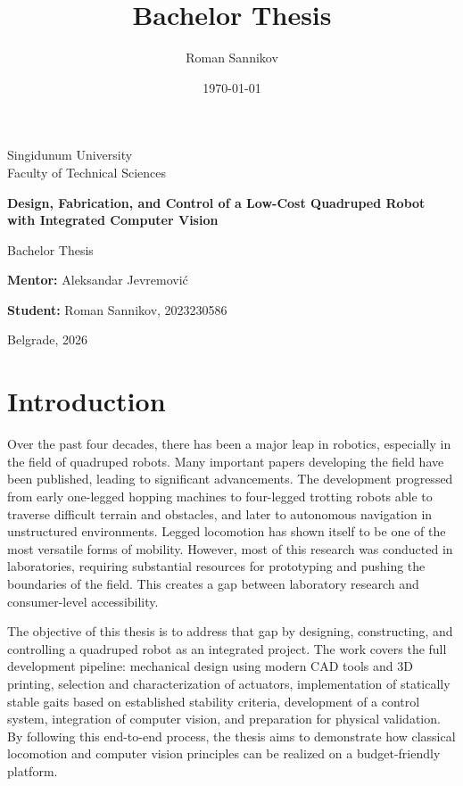 \documentclass[a4paper,12pt]{report}
\title{Bachelor Thesis}
\author{Roman Sannikov}
\date{\today}
\begin{document}
\begin{titlepage}
  \centering
  \vspace*{1cm}
  {\Large Singidunum University\\Faculty of Technical Sciences\par}
  \vfill
  {\LARGE\bfseries Design, Fabrication, and Control of a Low-Cost Quadruped Robot with Integrated
Computer Vision\par}
  \vspace{1cm}
  {\large Bachelor Thesis\par}
  \vfill
  \noindent
  \begin{minipage}[t]{0.48\textwidth}
    \textbf{Mentor:} Aleksandar Jevremović\par
  \end{minipage}
  \hfill
  \begin{minipage}[t]{0.48\textwidth}
    \raggedleft\textbf{Student:} Roman Sannikov, 2023230586\par
  \end{minipage}
  \vfill
  Belgrade, 2026\par
\end{titlepage}
\tableofcontents
\cleardoublepage


\chapter{Introduction}
Over the past four decades, there has been a major leap in robotics, especially in the field of
quadruped robots. Many important papers developing the field have been published, leading to
significant advancements. The development progressed from early one-legged hopping machines to
four-legged trotting robots able to traverse difficult terrain and obstacles, and later to
autonomous navigation in unstructured environments. Legged locomotion has shown itself to be one
of the most versatile forms of mobility. However, most of this research was conducted in
laboratories, requiring substantial resources for prototyping and pushing the boundaries of the
field. This creates a gap between laboratory research and consumer-level accessibility.

The objective of this thesis is to address that gap by designing, constructing, and controlling
a quadruped robot as an integrated project. The work covers the full development pipeline:
mechanical design using modern CAD tools and 3D printing, selection and characterization of
actuators, implementation of statically stable gaits based on established stability criteria,
development of a control system, integration of computer vision, and preparation for physical
validation. By following this end-to-end process, the thesis aims to demonstrate how classical
locomotion and computer vision principles can be realized on a budget-friendly platform.
\end{document}

